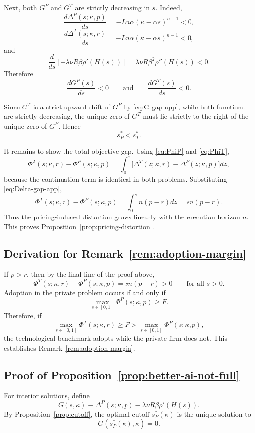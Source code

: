 Next, both $G^P$ and $G^T$ are strictly decreasing in $s$. Indeed,
\[
\frac{d\Delta^P(s;\kappa,p)}{ds}
=
-Ln\alpha(\kappa-\alpha s)^{n-1}<0,
\]
\[
\frac{d\Delta^T(s;\kappa,r)}{ds}
=
-Ln\alpha(\kappa-\alpha s)^{n-1}<0,
\]
and
\[
\frac{d}{ds}\!\left[-\lambda \nu R \beta \rho'(H(s))\right]
=
\lambda \nu R \beta^2 \rho''(H(s))<0.
\]
Therefore
\[
\frac{dG^P(s)}{ds}<0
\qquad\text{and}\qquad
\frac{dG^T(s)}{ds}<0.
\]

Since $G^T$ is a strict upward shift of $G^P$ by \eqref{eq:G-gap-app}, while both functions are strictly decreasing, the unique zero of $G^T$ must lie strictly to the right of the unique zero of $G^P$. Hence
\[
s_P^\ast<s_T^\ast.
\]

It remains to show the total-objective gap. Using \eqref{eq:PhiP} and \eqref{eq:PhiT},
\[
\Phi^T(s;\kappa,r)-\Phi^P(s;\kappa,p)
=
\int_0^s \bigl[\Delta^T(z;\kappa,r)-\Delta^P(z;\kappa,p)\bigr]dz,
\]
because the continuation term is identical in both problems. Substituting \eqref{eq:Delta-gap-app},
\[
\Phi^T(s;\kappa,r)-\Phi^P(s;\kappa,p)
=
\int_0^s n(p-r)dz
=
sn(p-r).
\]
Thus the pricing-induced distortion grows linearly with the execution horizon $n$. This proves Proposition~\ref{prop:pricing-distortion}.

\subsection*{Derivation for Remark~\ref{rem:adoption-margin}}

If $p>r$, then by the final line of the proof above,
\[
\Phi^T(s;\kappa,r)-\Phi^P(s;\kappa,p)=sn(p-r)>0
\qquad
\text{for all } s>0.
\]
Adoption in the private problem occurs if and only if
\[
\max_{s\in[0,1]} \Phi^P(s;\kappa,p)\ge F.
\]
Therefore, if
\[
\max_{s\in[0,1]} \Phi^T(s;\kappa,r)\ge F>\max_{s\in[0,1]} \Phi^P(s;\kappa,p),
\]
the technological benchmark adopts while the private firm does not. This establishes Remark~\ref{rem:adoption-margin}.

\subsection*{Proof of Proposition~\ref{prop:better-ai-not-full}}

For interior solutions, define
\[
G(s,\kappa)\equiv \Delta^P(s;\kappa,p)-\lambda \nu R \beta \rho'(H(s)).
\]
By Proposition~\ref{prop:cutoff}, the optimal cutoff $s_P^\ast(\kappa)$ is the unique solution to
\begin{equation}
\label{eq:G-zero-app}
G(s_P^\ast(\kappa),\kappa)=0.
\end{equation}

